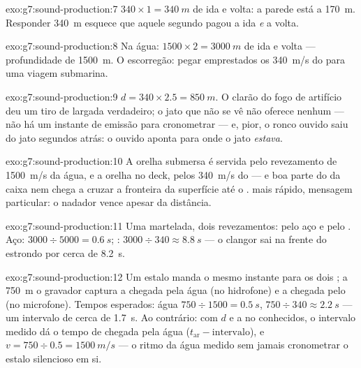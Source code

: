 \begin{solution}{exo:g7:sound-production:7}
$340 \times 1 = \qty{340}{m}$ de ida e volta: a parede está a
\qty{170}{m}. Responder \qty{340}{m} esquece que aquele segundo pagou
a ida \emph{e} a volta.
\end{solution}

\begin{solution}{exo:g7:sound-production:8}
Na água: $1500 \times 2 = \qty{3000}{m}$ de ida e volta ---
profundidade de \qty{1500}{m}. O escorregão: pegar emprestados os
\qty{340}{m/s} do  para uma viagem submarina.
\end{solution}

\begin{solution}{exo:g7:sound-production:9}
$d = 340 \times 2.5 = \qty{850}{m}$. O clarão do fogo de artifício
deu um tiro de largada verdadeiro; o jato que não se vê não oferece
nenhum --- não há um instante de emissão para cronometrar --- e,
pior, o ronco ouvido saiu do jato segundos atrás: o ouvido aponta
para onde o jato \emph{estava}.
\end{solution}

\begin{solution}{exo:g7:sound-production:10}
A orelha submersa é servida pelo revezamento de \qty{1500}{m/s} da
água, e a orelha no deck, pelos \qty{340}{m/s} do  --- e boa parte
do  da caixa nem chega a cruzar a fronteira da superfície até o
.  mais rápido, mensagem particular: o nadador vence apesar da
distância.
\end{solution}

\begin{solution}{exo:g7:sound-production:11}
Uma martelada, dois revezamentos: pelo aço e pelo . Aço:
$3000 \div 5000 = \qty{0.6}{s}$; :
$3000 \div 340 \approx \qty{8.8}{s}$ --- o clangor sai na frente do
estrondo por cerca de \qty{8.2}{s}.
\end{solution}

\begin{solution}{exo:g7:sound-production:12}
Um estalo manda o mesmo instante para os dois ; a \qty{750}{m} o
gravador captura a chegada pela água (no hidrofone) e a chegada pelo
 (no microfone). Tempos esperados: água
$750 \div 1500 = \qty{0.5}{s}$, 
$750 \div 340 \approx \qty{2.2}{s}$ --- um intervalo de cerca de
\qty{1.7}{s}. Ao contrário: com $d$ e a  no  conhecidos, o
intervalo medido dá o tempo de chegada pela água
($t_{\text{ar}} - \text{intervalo}$), e
$v = 750 \div 0.5 = \qty{1500}{m/s}$ --- o ritmo da água medido sem
jamais cronometrar o estalo silencioso em si.
\end{solution}

